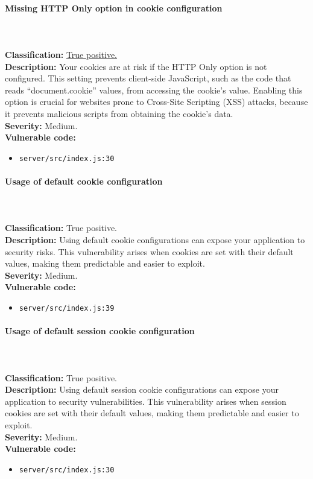 \documentclass[]{article}
\begin{document}
\paragraph{Missing HTTP Only option in cookie configuration} \mbox{} \\ \\
\textbf{Classification:} \hyperref[subsubsec:sensitive_cookie_without_secure_and_httponly_attributes]{True positive.} \\
\textbf{Description:} Your cookies are at risk if the HTTP Only option is not configured. This setting prevents client-side JavaScript, such as the code that reads ``document.cookie'' values, from accessing the cookie's value. Enabling this option is crucial for websites prone to Cross-Site Scripting (XSS) attacks, because it prevents malicious scripts from obtaining the cookie's data. \\ 
\textbf{Severity:} Medium. \\ 
\textbf{Vulnerable code:}
\begin{itemize}
    \item \texttt{server/src/index.js:30}
\end{itemize}

\paragraph{Usage of default cookie configuration} \mbox{} \\ \\
\textbf{Classification:} True positive. \\
\textbf{Description:} Using default cookie configurations can expose your application to security risks. This vulnerability arises when cookies are set with their default values, making them predictable and easier to exploit. \\ 
\textbf{Severity:} Medium. \\ 
\textbf{Vulnerable code:}
\begin{itemize}
    \item \texttt{server/src/index.js:39}
\end{itemize}

\paragraph{Usage of default session cookie configuration} \mbox{} \\ \\
\textbf{Classification:} True positive. \\
\textbf{Description:} Using default session cookie configurations can expose your application to security vulnerabilities. This vulnerability arises when session cookies are set with their default values, making them predictable and easier to exploit. \\ 
\textbf{Severity:} Medium. \\ 
\textbf{Vulnerable code:}
\begin{itemize}
    \item \texttt{server/src/index.js:30}
\end{itemize}
\end{document}

